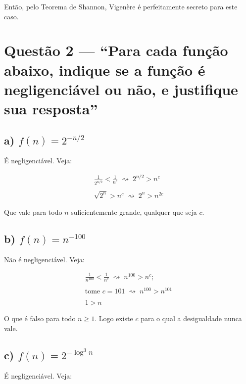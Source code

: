 \documentclass[11pt,a4paper]{article}
\begin{document}
Então, pelo Teorema de Shannon, Vigenère é perfeitamente secreto para este caso.

\clearpage
\section*{Questão 2 --- ``Para cada função abaixo, indique se a função é
negligenciável ou não, e justifique sua resposta''}

\subsection*{a) $f(n) = 2^{-n/2}$}

É negligenciável. Veja:

\begin{gather*}
    \frac{1}{2^{n/2}} < \frac{1}{n^{c}} \;\rightsquigarrow\; 2^{n/2} > n^{c} \\ \\
    \sqrt{2^{n}} > n^{c} \;\rightsquigarrow\; 2^{n} > n^{2c}
\end{gather*}

Que vale para todo $n$ suficientemente grande, qualquer que seja $c$.

\subsection*{b) $f(n) = n^{-100}$}

Não é negligenciável. Veja:

\begin{gather*}
    \frac{1}{n^{100}} < \frac{1}{n^{c}} \;\rightsquigarrow\; n^{100} > n^{c}; \\ \\
    \text{tome } c = 101 \;\rightsquigarrow\; n^{100} > n^{101} \\ \\
    1 > n
\end{gather*}

O que é falso para todo $n \geq 1$.
Logo existe $c$ para o qual a desigualdade
nunca vale.

\subsection*{c) $f(n) = 2^{-\log^{3} n}$}

É negligenciável. Veja:
\end{document}
